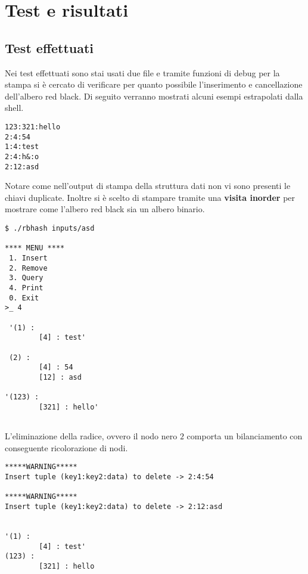 \def\baselinestretch{1}
\section{Test e risultati}
\def\baselinestretch{1.66}
\thispagestyle{headings}

\subsection{Test effettuati}
Nei test effettuati sono stai usati due file e tramite funzioni di debug per 
la stampa si \`e cercato di verificare per quanto possibile l'inserimento
e cancellazione dell'albero red black. Di seguito verranno mostrati 
alcuni esempi estrapolati dalla shell.\newpage

\begin{lstlisting}[caption={File di prova con chiavi duplicate},captionpos=b]
123:321:hello
2:4:54
1:4:test
2:4:h&:o
2:12:asd
\end{lstlisting}

Notare come nell'output di stampa della struttura dati non vi sono presenti le chiavi
duplicate. Inoltre si \`e scelto di stampare tramite una \textbf{visita inorder} per mostrare
come l'albero red black sia un albero binario.
\begin{verbatim}
$ ./rbhash inputs/asd

**** MENU ****
 1. Insert
 2. Remove
 3. Query
 4. Print
 0. Exit
>_ 4

 '(1) :
        [4] : test'

 (2) :
        [4] : 54
        [12] : asd

'(123) :
        [321] : hello'
        
\end{verbatim}

L'eliminazione della radice, ovvero il nodo nero $2$ comporta un bilanciamento con
conseguente ricolorazione di nodi.


\begin{verbatim}
*****WARNING*****
Insert tuple (key1:key2:data) to delete -> 2:4:54

*****WARNING*****
Insert tuple (key1:key2:data) to delete -> 2:12:asd


'(1) :
        [4] : test'
(123) :
        [321] : hello

\end{verbatim}